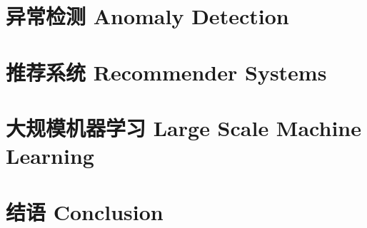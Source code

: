 \documentclass[12pt, a4paper]{article}
\begin{document}
    \section{异常检测 Anomaly Detection}

    \section{推荐系统 Recommender Systems}

    \section{大规模机器学习 Large Scale Machine Learning}

    \section{结语 Conclusion}
\end{document}

